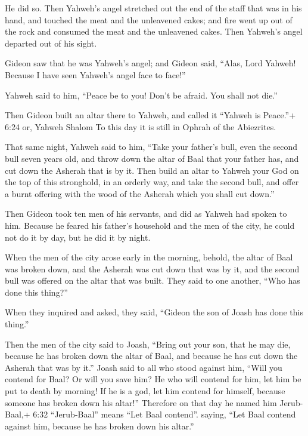 He did so.  Then Yahweh's angel stretched out the end of
the staff that was in his hand, and touched the meat and the unleavened
cakes; and fire went up out of the rock and consumed the meat and the
unleavened cakes. Then Yahweh's angel departed out of his sight.

 Gideon saw that he was Yahweh's angel; and Gideon said,
``Alas, Lord Yahweh! Because I have seen Yahweh's angel face to face!''

 Yahweh said to him, ``Peace be to you! Don't be afraid.
You shall not die.''

 Then Gideon built an altar there to Yahweh, and called it
``Yahweh is Peace.''+ 6:24 or, Yahweh Shalom To this day it is still in
Ophrah of the Abiezrites.

 That same night, Yahweh said to him, ``Take your father's
bull, even the second bull seven years old, and throw down the altar of
Baal that your father has, and cut down the Asherah that is by it.
 Then build an altar to Yahweh your God on the top of this
stronghold, in an orderly way, and take the second bull, and offer a
burnt offering with the wood of the Asherah which you shall cut down.''

 Then Gideon took ten men of his servants, and did as
Yahweh had spoken to him. Because he feared his father's household and
the men of the city, he could not do it by day, but he did it by night.

 When the men of the city arose early in the morning,
behold, the altar of Baal was broken down, and the Asherah was cut down
that was by it, and the second bull was offered on the altar that was
built.  They said to one another, ``Who has done this
thing?''

When they inquired and asked, they said, ``Gideon the son of Joash has
done this thing.''

 Then the men of the city said to Joash, ``Bring out your
son, that he may die, because he has broken down the altar of Baal, and
because he has cut down the Asherah that was by it.'' 
Joash said to all who stood against him, ``Will you contend for Baal? Or
will you save him? He who will contend for him, let him be put to death
by morning! If he is a god, let him contend for himself, because someone
has broken down his altar!''  Therefore on that day he
named him Jerub-Baal,+ 6:32 ``Jerub-Baal'' means ``Let Baal contend''.
saying, ``Let Baal contend against him, because he has broken down his
altar.''

